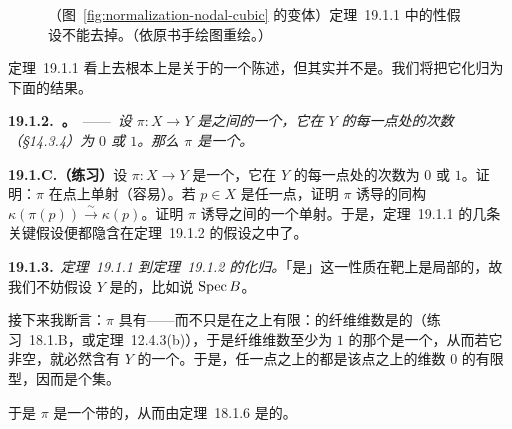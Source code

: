 \begin{figure}[htbp]
\centering
{}
\caption{（图~\ref{fig:normalization-nodal-cubic} 的变体）\mbox{定理~19.1.1} 中的\trProjective{}性假设不能去掉。（依原书手绘图重绘。）}\label{fig:projectivity-node-example}
\end{figure}

\mbox{定理~19.1.1} 看上去根本上是关于\trVariety{}的一个陈述，但其实并不是。我们将把它化归为下面的结果。

\textbf{19.1.2.\ \trhTheorem。}\ ——\ \emph{设 $\pi\colon X\to Y$ 是\trNoetherian{}\trScheme{}之间的一个\trFinite\trMorphism，它在 $Y$ 的每一点处的次数（\S14.3.4）为 $0$ 或 $1$。那么 $\pi$ 是一个\trClosedEmbedding。}

\textbf{19.1.C.（练习）}\quad 设 $\pi\colon X\to Y$ 是一个\trFinite\trMorphism，它在 $Y$ 的每一点处的次数为 $0$ 或 $1$。证明：$\pi$ 在点上单射（容易）。若 $p\in X$ 是任一点，证明 $\pi$ 诱导\trResidueField{}的同构 $\kappa(\pi(p))\overset{\sim}{\longrightarrow}\kappa(p)$。证明 $\pi$ 诱导\trTangentSpace{}之间的一个单射。于是，\mbox{定理~19.1.1} 的几条关键假设便都隐含在\mbox{定理~19.1.2} 的假设之中了。

\textbf{19.1.3.}\ \emph{\mbox{定理~19.1.1} 到\mbox{定理~19.1.2} 的化归。}\quad 「是\trClosedEmbedding」这一性质在靶上是局部的，故我们不妨假设 $Y$ 是\trAffine{}的，比如说 $\operatorname{Spec} B$。

接下来我断言：$\pi$ 具有\trFinite\trFiber——而不只是在\trClosedPoint{}之上\trFiber{}有限：\trProjective\trMorphism{}的纤维维数是\trUpperSemicontinuous{}的（\mbox{练习~18.1.B}，或\mbox{定理~12.4.3(b)}），于是纤维维数至少为 $1$ 的那个\trLocus{}是一个\trClosedSubset，从而若它非空，就必然含有 $Y$ 的一个\trClosedPoint。于是，任一点之上的\trFiber{}都是该点之上的维数 $0$ 的有限型\trScheme，因而是个\trFinite{}集。

于是 $\pi$ 是一个带\trFinite\trFiber{}的\trProjective\trMorphism，从而由\mbox{定理~18.1.6} 是\trFinite{}的。

